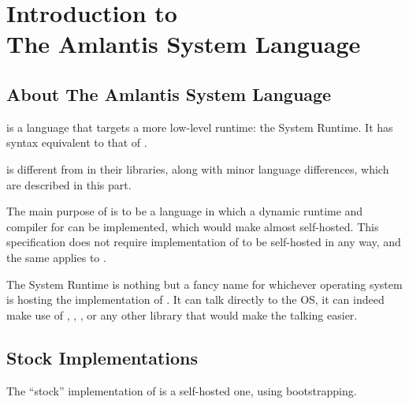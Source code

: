 
\chapter[Introduction to The Amlantis System Language]{Introduction to \\The Amlantis System Language}

\minitoc

\newpage


\section{About The Amlantis System Language}

\AmlSystem is a language that targets a more low-level runtime: the System Runtime. It has syntax equivalent to that of \Aml. 

\AmlSystem is different from \Aml in their libraries, along with minor language differences, which are described in this part. 

The main purpose of \AmlSystem is to be a language in which a dynamic runtime and compiler for \Aml can be implemented, which would make \Aml almost self-hosted. This specification does not require implementation of \AmlSystem to be self-hosted in any way, and the same applies to \Aml.

The System Runtime is nothing but a fancy name for whichever operating system is hosting the implementation of \AmlSystem. It can talk directly to the OS, it can indeed make use of , , , or any other library that would make the talking easier. 





\section{Stock Implementations}

The ``stock'' implementation of \AmlSystem is a self-hosted one, using bootstrapping.

